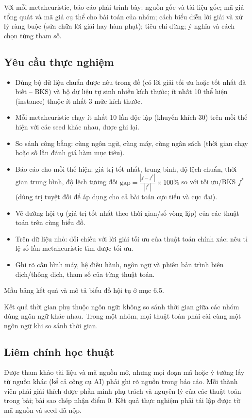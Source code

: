 \documentclass[a4paper,11pt]{article}
\newcommand{\topichead}[1]{\par\medskip{\bfseries #1}\par\smallskip}
\begin{document}
Với mỗi metaheuristic, báo cáo phải trình bày: nguồn gốc và tài liệu gốc; mã giả tổng quát và mã giả cụ thể cho bài toán của nhóm; cách biểu diễn lời giải và xử lý ràng buộc (sửa chữa lời giải hay hàm phạt); tiêu chí dừng; ý nghĩa và cách chọn từng tham số.

\subsection{Yêu cầu thực nghiệm}
\begin{itemize}
\item Dùng bộ dữ liệu chuẩn được nêu trong đề (có lời giải tối ưu hoặc tốt nhất đã biết – BKS) và bộ dữ liệu tự sinh nhiều kích thước; ít nhất 10 thể hiện (instance) thuộc ít nhất 3 mức kích thước.
\item Mỗi metaheuristic chạy ít nhất 10 lần độc lập (khuyến khích 30) trên mỗi thể hiện với các seed khác nhau, được ghi lại.
\item So sánh công bằng: cùng ngôn ngữ, cùng máy, cùng ngân sách (thời gian chạy hoặc số lần đánh giá hàm mục tiêu).
\item Báo cáo cho mỗi thể hiện: giá trị tốt nhất, trung bình, độ lệch chuẩn, thời gian trung bình, độ lệch tương đối $\mathrm{gap}=\frac{|f-f^*|}{|f^*|}\times100\%$ so với tối ưu/BKS $f^*$ (dùng trị tuyệt đối để áp dụng cho cả bài toán cực tiểu và cực đại).
\item Vẽ đường hội tụ (giá trị tốt nhất theo thời gian/số vòng lặp) của các thuật toán trên cùng biểu đồ.
\item Trên dữ liệu nhỏ: đối chiếu với lời giải tối ưu của thuật toán chính xác; nêu tỉ lệ số lần metaheuristic tìm được tối ưu.
\item Ghi rõ cấu hình máy, hệ điều hành, ngôn ngữ và phiên bản trình biên dịch/thông dịch, tham số của từng thuật toán.
\end{itemize}
Mẫu bảng kết quả và mô tả biểu đồ hội tụ ở mục 6.5.

\topichead{Lưu ý}
Kết quả thời gian phụ thuộc ngôn ngữ: không so sánh thời gian giữa các nhóm dùng ngôn ngữ khác nhau. Trong một nhóm, mọi thuật toán phải cài cùng một ngôn ngữ khi so sánh thời gian.

\subsection{Liêm chính học thuật}
Được tham khảo tài liệu và mã nguồn mở, nhưng mọi đoạn mã hoặc ý tưởng lấy từ nguồn khác (kể cả công cụ AI) phải ghi rõ nguồn trong báo cáo. Mỗi thành viên phải giải thích được phần mình phụ trách và nguyên lý của các thuật toán trong bài; bài sao chép nhận điểm 0. Kết quả thực nghiệm phải tái lập được từ mã nguồn và seed đã nộp.
\end{document}
